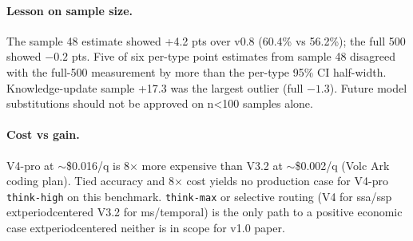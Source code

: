 \paragraph{Lesson on sample size.} The sample 48 estimate showed +4.2
pts over v0.8 (60.4\% vs 56.2\%); the full 500 showed \(-0.2\) pts. Five
of six per-type point estimates from sample 48 disagreed with the
full-500 measurement by more than the per-type 95\% CI half-width.
Knowledge-update sample +17.3 was the largest outlier (full \(-1.3\)).
Future model substitutions should not be approved on n<100 samples
alone.

\paragraph{Cost vs gain.} V4-pro at $\sim$\$0.016/q is 8× more
expensive than V3.2 at $\sim$\$0.002/q (Volc Ark coding plan). Tied
accuracy and 8× cost yields no production case for V4-pro
\texttt{think-high} on this benchmark. \texttt{think-max} or
selective routing (V4 for ssa/ssp 	extperiodcentered{}  V3.2 for ms/temporal) is the only
path to a positive economic case 	extperiodcentered{}  neither is in scope for v1.0 paper.

